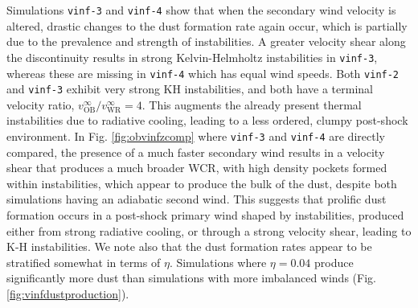 \documentclass[fleqn,usenatbib]{mnras}
\begin{document}
Simulations \texttt{vinf-3} and \texttt{vinf-4} show that when the secondary wind velocity is altered, drastic changes to the dust formation rate again occur, which is partially due to the prevalence and strength of instabilities.
A greater velocity shear along the discontinuity results in strong Kelvin-Helmholtz instabilities in \texttt{vinf-3}, whereas these are missing in \texttt{vinf-4} which has equal wind speeds.
Both \texttt{vinf-2} and \texttt{vinf-3} exhibit very strong KH instabilities, and both have a terminal velocity ratio, $v_\text{OB}^\infty / v_\text{WR}^\infty = 4$.
This augments the already present thermal instabilities due to radiative cooling, leading to a less ordered, clumpy post-shock environment.
In Fig. \ref{fig:obvinfzcomp} where \texttt{vinf-3} and \texttt{vinf-4} are directly compared, the presence of a much faster secondary wind results in a velocity shear that produces a much broader WCR, with high density pockets formed within instabilities, which appear to produce the bulk of the dust, despite both simulations having an adiabatic second wind. 
This suggests that prolific dust formation occurs in a post-shock primary wind shaped by instabilities, produced either from strong radiative cooling, or through a strong velocity shear, leading to K-H instabilities.
We note also that the dust formation rates appear to be stratified somewhat in terms of $\eta$.
Simulations where $\eta = 0.04$ produce significantly more dust than simulations with more imbalanced winds (Fig. \ref{fig:vinfdustproduction}).
\end{document}
